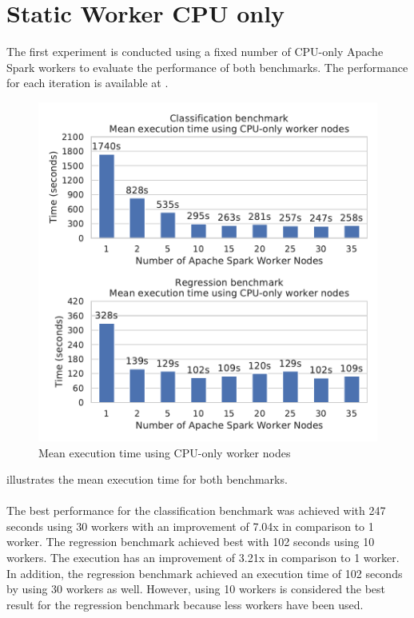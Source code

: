 \section{Static Worker CPU only}
\label{sec:07_static}
The first experiment is conducted using a fixed number of CPU-only Apache Spark workers to evaluate the performance of both benchmarks.
The performance for each iteration is available at .
\begin{figure}[h]
\centering
\includegraphics[scale=0.9]{images/07_evaluation/overall_cpu}
\caption{Mean execution time using CPU-only worker nodes}
\label{fig:07_static_results}
\end{figure}
 illustrates the mean execution time for both benchmarks.

\paragraph{}
The best performance for the classification benchmark was achieved with 247 seconds using 30 workers with an improvement of 7.04x in comparison to 1 worker. The regression benchmark achieved best with 102 seconds using 10 workers. The execution has an improvement of 3.21x in comparison to 1 worker. In addition, the regression benchmark achieved an execution time of 102 seconds by using 30 workers as well. However, using 10 workers is considered the best result for the regression benchmark because less workers have been used.

